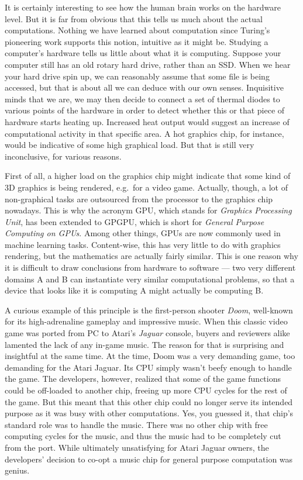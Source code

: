 It is certainly interesting to see how the human brain works on the hardware level.
But it is far from obvious that this tells us much about the actual computations.
Nothing we have learned about computation since Turing's pioneering work supports this notion, intuitive as it might be.
Studying a computer's hardware tells us little about what it is computing.
Suppose your computer still has an old rotary hard drive, rather than an SSD\@.
When we hear your hard drive spin up, we can reasonably assume that some file is being accessed, but that is about all we can deduce with our own senses.
Inquisitive minds that we are, we may then decide to connect a set of thermal diodes to various points of the hardware in order to detect whether this or that piece of hardware starts heating up.
Increased heat output would suggest an increase of computational activity in that specific area.
A hot graphics chip, for instance, would be indicative of some high graphical load.
But that is still very inconclusive, for various reasons.

First of all, a higher load on the graphics chip might indicate that some kind of 3D graphics is being rendered, e.g.~for a video game.
Actually, though, a lot of non-graphical tasks are outsourced from the processor to the graphics chip nowadays.
This is why the acronym GPU, which stands for \emph{Graphics Processing Unit}, has been extended to GPGPU, which is short for \emph{General Purpose Computing on GPUs}.
Among other things, GPUs are now commonly used in machine learning tasks.
Content-wise, this has very little to do with graphics rendering, but the mathematics are actually fairly similar.
This is one reason why it is difficult to draw conclusions from hardware to software --- two very different domains A and B can instantiate very similar computational problems, so that a device that looks like it is computing A might actually be computing B\@.

A curious example of this principle is the first-person shooter \emph{Doom}, well-known for its high-adrenaline gameplay and impressive music.
When this classic video game was ported from PC to Atari's \emph{Jaguar} console, buyers and reviewers alike lamented the lack of any in-game music.
The reason for that is surprising and insightful at the same time.
At the time, Doom was a very demanding game, too demanding for the Atari Jaguar.
Its CPU simply wasn't beefy enough to handle the game.
The developers, however, realized that some of the game functions could be off-loaded to another chip, freeing up more CPU cycles for the rest of the game.
But this meant that this other chip could no longer serve its intended purpose as it was busy with other computations.
Yes, you guessed it, that chip's standard role was to handle the music. 
There was no other chip with free computing cycles for the music, and thus the music had to be completely cut from the port.
While ultimately unsatisfying for Atari Jaguar owners, the developers' decision to co-opt a music chip for general purpose computation was genius.

